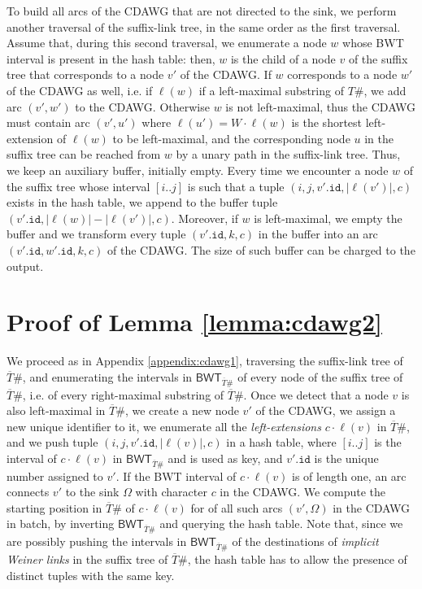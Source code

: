 \documentclass[a4paper,UKenglish]{lipics-v2016}
\newcommand{\REV}[1]{\ensuremath{\overline{#1}}}
\newcommand{\BWT}{\ensuremath{\mathsf{BWT}}}
\begin{document}
To build all arcs of the CDAWG that are not directed to the sink, we perform another traversal of the suffix-link tree, in the same order as the first traversal. Assume that, during this second traversal, we enumerate a node $w$ whose BWT interval is present in the hash table: then, $w$ is the child of a node $v$ of the suffix tree that corresponds to a node $v'$ of the CDAWG. If $w$ corresponds to a node $w'$ of the CDAWG as well, i.e. if $\ell(w)$ if a left-maximal substring of $T\#$, we add arc $(v',w')$ to the CDAWG. Otherwise $w$ is not left-maximal, thus the CDAWG must contain arc $(v',u')$ where $\ell(u') = W \cdot \ell(w)$ is the shortest left-extension of $\ell(w)$ to be left-maximal, and the corresponding node $u$ in the suffix tree can be reached from $w$ by a unary path in the suffix-link tree. Thus, we keep an auxiliary buffer, initially empty. Every time we encounter a node $w$ of the suffix tree whose interval $[i..j]$ is such that a tuple $(i,j,v'.\mathtt{id},|\ell(v')|,c)$ exists in the hash table, we append to the buffer tuple $(v'.\mathtt{id},|\ell(w)|-|\ell(v')|,c)$. Moreover, if $w$ is left-maximal, we empty the buffer and we transform every tuple $(v'.\mathtt{id},k,c)$ in the buffer into an arc $(v'.\mathtt{id},w'.\mathtt{id},k,c)$ of the CDAWG. The size of such buffer can be charged to the output.





\section{Proof of Lemma \ref{lemma:cdawg2}} \label{appendix:cdawg2}

We proceed as in Appendix \ref{appendix:cdawg1}, traversing the suffix-link tree of $\REV{T}\#$, and enumerating the intervals in $\BWT_{\REV{T}\#}$ of every node of the suffix tree of $\REV{T}\#$, i.e. of every right-maximal substring of $\REV{T}\#$. Once we detect that a node $v$ is also left-maximal in $\REV{T}\#$, we create a new node $v'$ of the CDAWG, we assign a new unique identifier to it, we enumerate all the \emph{left-extensions} $c \cdot \ell(v)$ in $\REV{T}\#$, and we push tuple $(i,j,v'.\mathtt{id},|\ell(v)|,c)$ in a hash table, where $[i..j]$ is the interval of $c \cdot \ell(v)$ in $\BWT_{\REV{T}\#}$ and is used as key, and $v'.\mathtt{id}$ is the unique number assigned to $v'$. If the BWT interval of $c \cdot \ell(v)$ is of length one, an arc connects $v'$ to the sink $\Omega$ with character $c$ in the CDAWG. We compute the starting position in $\REV{T}\#$ of $c \cdot \ell(v)$ for of all such arcs $(v',\Omega)$ in the CDAWG in batch, by inverting $\BWT_{\REV{T}\#}$ and querying the hash table. Note that, since we are possibly pushing the intervals in $\BWT_{\REV{T}\#}$ of the destinations of \emph{implicit Weiner links} in the suffix tree of $\REV{T}\#$, the hash table has to allow the presence of distinct tuples with the same key.
\end{document}
